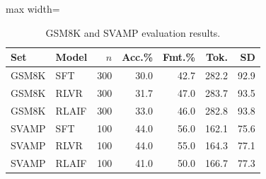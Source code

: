 \begin{table}[!htbp]
\centering

\scriptsize
\setlength{\tabcolsep}{3.4pt}
\begin{adjustbox}{max width=\linewidth}
\begin{tabular}{llrrrrr}
\toprule
Set & Model & $n$ & Acc.\% & Fmt.\% & Tok. & SD \\
\midrule
GSM8K & SFT & 300 & 30.0 & 42.7 & 282.2 & 92.9 \\
GSM8K & RLVR & 300 & 31.7 & 47.0 & 283.7 & 93.5 \\
GSM8K & RLAIF & 300 & 33.0 & 46.0 & 282.8 & 93.8 \\
SVAMP & SFT & 100 & 44.0 & 56.0 & 162.1 & 75.6 \\
SVAMP & RLVR & 100 & 44.0 & 55.0 & 164.3 & 77.1 \\
SVAMP & RLAIF & 100 & 41.0 & 50.0 & 166.7 & 77.3 \\
\bottomrule
\end{tabular}
\end{adjustbox}

\caption{GSM8K and SVAMP evaluation results.}
\label{tab:math}

\end{table}
